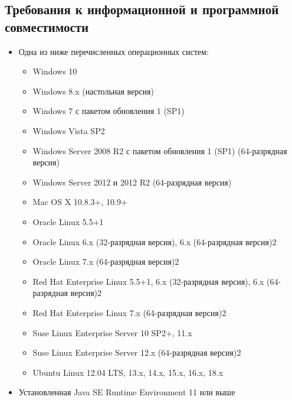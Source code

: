 \documentclass{../TechDoc}
\begin{document}
	\subsection{Требования к информационной и программной совместимости}
	\begin{itemize}
		\item Одна из ниже перечисленных операционных систем:
		\begin{itemize}
			\item Windows 10
			\item Windows 8.x (настольная версия)
			\item Windows 7 с пакетом обновления 1 (SP1)
			\item Windows Vista SP2
			\item Windows Server 2008 R2 с пакетом обновления 1 (SP1) (64-разрядная версия)
			\item Windows Server 2012 и 2012 R2 (64-разрядная версия)
			\item Mac OS X 10.8.3+, 10.9+
			\item Oracle Linux 5.5+1
			\item Oracle Linux 6.x (32-разрядная версия), 6.x (64-разрядная версия)2
			\item Oracle Linux 7.x (64-разрядная версия)2
			\item Red Hat Enterprise Linux 5.5+1, 6.x (32-разрядная версия), 6.x (64-разрядная версия)2
			\item Red Hat Enterprise Linux 7.x (64-разрядная версия)2
			\item Suse Linux Enterprise Server 10 SP2+, 11.x
			\item Suse Linux Enterprise Server 12.x (64-разрядная версия)2
			\item Ubuntu Linux 12.04 LTS, 13.x, 14.x, 15.x, 16.x, 18.x
		\end{itemize}
		\item Установленная Java SE Runtime Environment 11 или выше
	\end{itemize}
\end{document}
